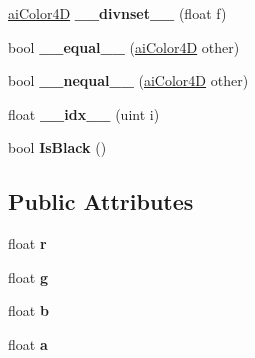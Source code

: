 \begin{DoxyCompactItemize}
\item 
\hypertarget{structai_color4_d_a0560fc520901a8bb98c20423e9923e92}{\hyperlink{structai_color4_d}{ai\+Color4\+D} {\bfseries \+\_\+\+\_\+divnset\+\_\+\+\_\+} (float f)}\label{structai_color4_d_a0560fc520901a8bb98c20423e9923e92}

\item 
\hypertarget{structai_color4_d_ae3d713a00df832f83d98789b2ef1abb6}{bool {\bfseries \+\_\+\+\_\+equal\+\_\+\+\_\+} (\hyperlink{structai_color4_d}{ai\+Color4\+D} other)}\label{structai_color4_d_ae3d713a00df832f83d98789b2ef1abb6}

\item 
\hypertarget{structai_color4_d_a682c19d865d47fc8d3cff478f8001677}{bool {\bfseries \+\_\+\+\_\+nequal\+\_\+\+\_\+} (\hyperlink{structai_color4_d}{ai\+Color4\+D} other)}\label{structai_color4_d_a682c19d865d47fc8d3cff478f8001677}

\item 
\hypertarget{structai_color4_d_ab86ed0ef822c4284ecca0294820ae4aa}{float {\bfseries \+\_\+\+\_\+idx\+\_\+\+\_\+} (uint i)}\label{structai_color4_d_ab86ed0ef822c4284ecca0294820ae4aa}

\item 
\hypertarget{structai_color4_d_ac2472397ea9ddc9b35f77759860367cd}{bool {\bfseries Is\+Black} ()}\label{structai_color4_d_ac2472397ea9ddc9b35f77759860367cd}

\end{DoxyCompactItemize}
\subsection*{Public Attributes}
\begin{DoxyCompactItemize}
\item 
\hypertarget{structai_color4_d_a989c2117cfae5a4457fa65f0257e93c7}{float {\bfseries r}}\label{structai_color4_d_a989c2117cfae5a4457fa65f0257e93c7}

\item 
\hypertarget{structai_color4_d_a32e929c7db12fb6f79f74a611f6d8fe6}{float {\bfseries g}}\label{structai_color4_d_a32e929c7db12fb6f79f74a611f6d8fe6}

\item 
\hypertarget{structai_color4_d_ab64376fc730371f8952f5f98084b2430}{float {\bfseries b}}\label{structai_color4_d_ab64376fc730371f8952f5f98084b2430}

\item 
\hypertarget{structai_color4_d_a1bf4f719c14e844dcd7ce5a1c1969c89}{float {\bfseries a}}\label{structai_color4_d_a1bf4f719c14e844dcd7ce5a1c1969c89}

\end{DoxyCompactItemize}
